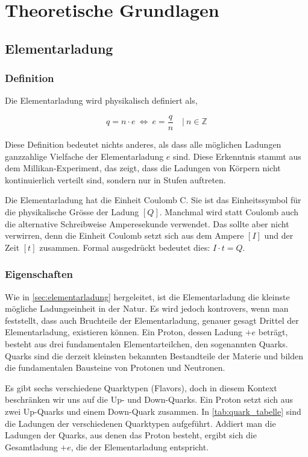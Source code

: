 \chapter{Theoretische Grundlagen}\label{ch:theorieGrundlagen}
\section{Elementarladung}\label{sec:elementarladung}
\subsection{Definition}\label{sub:definition}
Die Elementarladung wird physikalisch definiert als,

\begin{equation}\label{eq:definition}
 q  =  n \cdot e \:  \Leftrightarrow \: e = \frac{q}{n} \quad | \ n \in \mathbb{Z}
\end{equation}

\noindent Diese Definition bedeutet nichts anderes, als dass alle möglichen Ladungen ganzzahlige Vielfache der Elementarladung $e$ sind. Diese Erkenntnis stammt aus dem Millikan-Experiment, das zeigt, dass die Ladungen von Körpern nicht kontinuierlich verteilt sind, sondern nur in Stufen auftreten.

Die Elementarladung hat die Einheit Coulomb C. Sie ist das Einheitssymbol für die physikalische Grösse der Ladung $[Q]$. Manchmal wird statt Coulomb auch die alternative Schreibweise Amperesekunde verwendet. Das sollte aber nicht verwirren, denn die Einheit Coulomb setzt sich aus dem Ampere $[I]$ und der Zeit $[t]$ zusammen. Formal ausgedrückt bedeutet dies: $I \cdot t = Q$. 

\subsection{Eigenschaften}\label{sub:eigenschaften}
Wie in \autoref{sec:elementarladung} hergeleitet, ist die Elementarladung die kleinste mögliche Ladungseinheit in der Natur. Es wird jedoch kontrovers, wenn man feststellt, dass auch Bruchteile der Elementarladung, genauer gesagt Drittel der Elementarladung, existieren können. Ein Proton, dessen Ladung $+e$ beträgt, besteht aus drei fundamentalen Elementarteilchen, den sogenannten Quarks. Quarks sind die derzeit kleinsten bekannten Bestandteile der Materie und bilden die fundamentalen Bausteine von Protonen und Neutronen.

Es gibt sechs verschiedene Quarktypen (Flavors), doch in diesem Kontext beschränken wir uns auf die Up- und Down-Quarks. Ein Proton setzt sich aus zwei Up-Quarks und einem Down-Quark zusammen. In \autoref{tab:quark_tabelle} sind die Ladungen der verschiedenen Quarktypen aufgeführt. Addiert man die Ladungen der Quarks, aus denen das Proton besteht, ergibt sich die Gesamtladung $+e$, die der Elementarladung entspricht.

